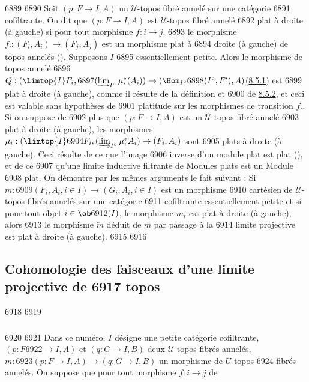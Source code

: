   6889	
  6890	Soit $(p : F \to I, A)$ un $𝒰$-topos fibré annelé sur une catégorie
  6891	cofiltrante. On dit que $(p : F \to I, A)$ est $𝒰$-topos fibré annelé
  6892	plat à droite (\resp à gauche) si pour tout morphisme $f : i \to j$,
  6893	le morphisme $f. : (F_i, A_i) \to (F_j, A_j)$ est un morphisme plat à
  6894	droite (\resp à gauche) de topos annelés (). Supposons $I$
  6895	essentiellement petite. Alors le morphisme de topos annelé
  6896	 $Q :(\limtop{I} F_i,
  6897	(\varinjlim_{I^{\circ}} \mu^{\ast}_i (A_i)) \to (\Hom_{I^{\circ}}
  6898	(I^{\circ}, F'), A)$\pageoriginale (\hyperref[VI.subsubsec8.5.1]{8.5.1}) est
  6899	plat à droite (\resp à gauche), comme il résulte de la définition et
  6900	de \hyperref[VI.prop8.5.2]{8.5.2}, et ceci est valable sans hypothèses de
  6901	platitude sur les morphismes de transition $f.$. Si on suppose de
  6902	plus que $(p : F \to I, A)$ est un $𝒰$-topos fibré annelé
  6903	plat à droite (\resp à gauche), les morphismes $\mu_i : (\limtop{I}
  6904	F_i, (\varinjlim_{I^{\circ}} \mu^{\ast}_i A_i) \to (F_i, A_i)$ sont
  6905	plats à droite (\resp à gauche). Ceci résulte de ce que l'image
  6906	inverse d'un module plat est plat (), et de ce
  6907	qu'une limite inductive filtrante de Modules plats est un Module
  6908	plat. On démontre par les mêmes arguments le fait suivant : Si $m :
  6909	(F_i, A_i, i \in I) \to (G_i, A_i, i \in I)$ est un morphisme
  6910	cartésien de $𝒰$-topos fibrés annelés sur une catégorie
  6911	cofiltrante essentiellement petite et si pour tout objet $i \in \ob
  6912	(I)$, le morphisme $m_i$ est plat à droite (\resp à gauche), alors
  6913	le morphisme $\underleftarrow{m}$ déduit de $m$ par passage à la
  6914	limite projective est plat à droite (\resp à gauche).
  6915	
  6916	\subsection{Cohomologie des faisceaux d'une limite projective de
  6917	  topos}
  6918	
  6919	\subsubsection{}
  6920	
  6921	Dans ce numéro, $I$ désigne une petite catégorie cofiltrante, $(p : F
  6922	\to I, A)$ et $(q : G \to I, B)$ deux $𝒰$-topos fibrés annelés, $m :
  6923	(p : F \to I, A) \to (q : G \to I, B)$ un morphisme de $U$-topos
  6924	fibrés annelés. On suppose que pour tout morphisme $f : i \to j$ de
